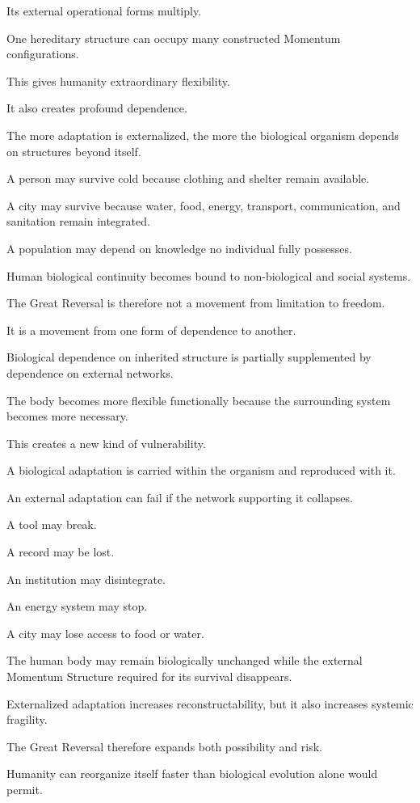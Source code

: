 Its external operational forms multiply.

One hereditary structure can occupy many constructed Momentum configurations.

This gives humanity extraordinary flexibility.

It also creates profound dependence.

The more adaptation is externalized, the more the biological organism depends on structures beyond itself.

A person may survive cold because clothing and shelter remain available.

A city may survive because water, food, energy, transport, communication, and sanitation remain integrated.

A population may depend on knowledge no individual fully possesses.

Human biological continuity becomes bound to non-biological and social systems.

The Great Reversal is therefore not a movement from limitation to freedom.

It is a movement from one form of dependence to another.

Biological dependence on inherited structure is partially supplemented by dependence on external networks.

The body becomes more flexible functionally because the surrounding system becomes more necessary.

This creates a new kind of vulnerability.

A biological adaptation is carried within the organism and reproduced with it.

An external adaptation can fail if the network supporting it collapses.

A tool may break.

A record may be lost.

An institution may disintegrate.

An energy system may stop.

A city may lose access to food or water.

The human body may remain biologically unchanged while the external Momentum Structure required for its survival disappears.

Externalized adaptation increases reconstructability, but it also increases systemic fragility.

The Great Reversal therefore expands both possibility and risk.

Humanity can reorganize itself faster than biological evolution alone would permit.

